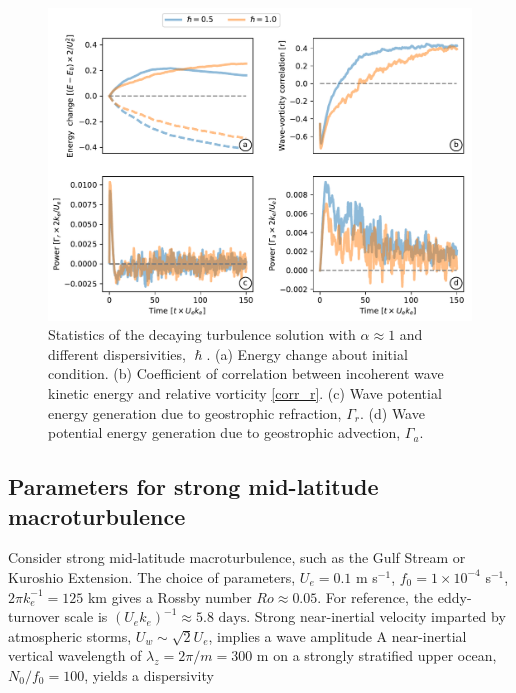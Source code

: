 \documentclass{jfm}
\begin{document}
 \begin{figure}
 \label{stats_turb_various}
 \centering
 \includegraphics[width=1.\textwidth]{figs/fig5.pdf}
 \caption{Statistics of the decaying turbulence solution with $\alpha \approx 1$ and
         different dispersivities, $\hslash$. (a) Energy change about initial condition.
         (b) Coefficient of correlation between
         incoherent wave
         kinetic energy and relative vorticity \eqref{corr_r}. (c) Wave potential
         energy generation
         due to geostrophic refraction, $\Gamma_r$. (d) Wave potential energy generation due
         to geostrophic advection, $\Gamma_a$.
         }
 \end{figure}



\subsection{Parameters for strong mid-latitude macroturbulence}

Consider strong mid-latitude macroturbulence, such as the Gulf Stream or Kuroshio
Extension. The choice of parameters, $U_e = 0.1$ m s$^{-1}$,
$f_0 = 1 \times 10^{-4}$ s$^{-1}$, $2\pi k_e^{-1} = 125$ km
gives a Rossby number $Ro \approx  0.05$. For reference, the eddy-turnover scale
is $(U_e k_e)^{-1}\approx 5.8\,\,\text{days}$. Strong near-inertial velocity
imparted by atmospheric storms, $U_w \sim \sqrt{2} U_e$, implies a wave amplitude
\beq
  \alpha {}\per
\eeq
A near-inertial vertical wavelength of $\lambda_z = 2\pi/m = 300$ m \citep[e.g., ][]{alford_etal2016}
on a strongly stratified upper ocean, $N_0/f_0 = 100$, yields a dispersivity
\beq
  \hslash {} \per
\eeq
\end{document}
